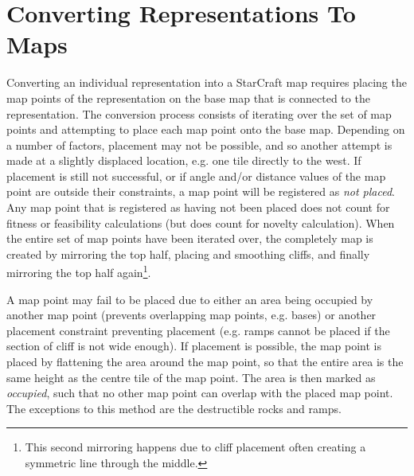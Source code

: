 \section{Converting Representations To Maps}
\label{methodology_conversion}
Converting an individual representation into a StarCraft map requires placing the map points of the representation on the base map that is connected to the representation. The conversion process consists of iterating over the set of map points and attempting to place each map point onto the base map. Depending on a number of factors, placement may not be possible, and so another attempt is made at a slightly displaced location, e.g. one tile directly to the west. If placement is still not successful, or if angle and/or distance values of the map point are outside their constraints, a map point will be registered as \textit{not placed}. Any map point that is registered as having not been placed does not count for fitness or feasibility calculations (but does count for novelty calculation). When the entire set of map points have been iterated over, the completely map is created by mirroring the top half, placing and smoothing cliffs, and finally mirroring the top half again\footnote{This second mirroring happens due to cliff placement often creating a symmetric line through the middle.}. 

A map point may fail to be placed due to either an area being occupied by another map point (prevents overlapping map points, e.g. bases) or another placement constraint preventing placement (e.g. ramps cannot be placed if the section of cliff is not wide enough). If placement is possible, the map point is placed by flattening the area around the map point, so that the entire area is the same height as the centre tile of the map point. The area is then marked as \textit{occupied}, such that no other map point can overlap with the placed map point. The exceptions to this method are the destructible rocks and ramps. 

